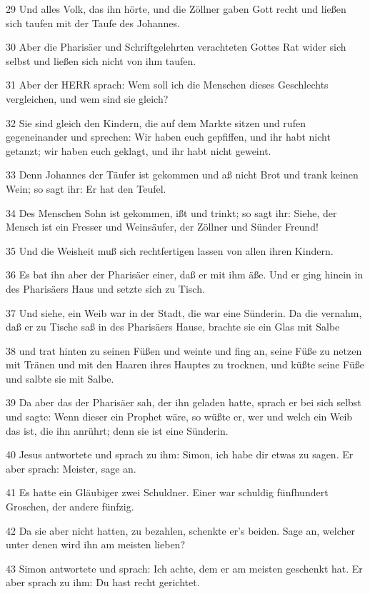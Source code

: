 \par 29 Und alles Volk, das ihn hörte, und die Zöllner gaben Gott recht und ließen sich taufen mit der Taufe des Johannes.
\par 30 Aber die Pharisäer und Schriftgelehrten verachteten Gottes Rat wider sich selbst und ließen sich nicht von ihm taufen.
\par 31 Aber der HERR sprach: Wem soll ich die Menschen dieses Geschlechts vergleichen, und wem sind sie gleich?
\par 32 Sie sind gleich den Kindern, die auf dem Markte sitzen und rufen gegeneinander und sprechen: Wir haben euch gepfiffen, und ihr habt nicht getanzt; wir haben euch geklagt, und ihr habt nicht geweint.
\par 33 Denn Johannes der Täufer ist gekommen und aß nicht Brot und trank keinen Wein; so sagt ihr: Er hat den Teufel.
\par 34 Des Menschen Sohn ist gekommen, ißt und trinkt; so sagt ihr: Siehe, der Mensch ist ein Fresser und Weinsäufer, der Zöllner und Sünder Freund!
\par 35 Und die Weisheit muß sich rechtfertigen lassen von allen ihren Kindern.
\par 36 Es bat ihn aber der Pharisäer einer, daß er mit ihm äße. Und er ging hinein in des Pharisäers Haus und setzte sich zu Tisch.
\par 37 Und siehe, ein Weib war in der Stadt, die war eine Sünderin. Da die vernahm, daß er zu Tische saß in des Pharisäers Hause, brachte sie ein Glas mit Salbe
\par 38 und trat hinten zu seinen Füßen und weinte und fing an, seine Füße zu netzen mit Tränen und mit den Haaren ihres Hauptes zu trocknen, und küßte seine Füße und salbte sie mit Salbe.
\par 39 Da aber das der Pharisäer sah, der ihn geladen hatte, sprach er bei sich selbst und sagte: Wenn dieser ein Prophet wäre, so wüßte er, wer und welch ein Weib das ist, die ihn anrührt; denn sie ist eine Sünderin.
\par 40 Jesus antwortete und sprach zu ihm: Simon, ich habe dir etwas zu sagen. Er aber sprach: Meister, sage an.
\par 41 Es hatte ein Gläubiger zwei Schuldner. Einer war schuldig fünfhundert Groschen, der andere fünfzig.
\par 42 Da sie aber nicht hatten, zu bezahlen, schenkte er's beiden. Sage an, welcher unter denen wird ihn am meisten lieben?
\par 43 Simon antwortete und sprach: Ich achte, dem er am meisten geschenkt hat. Er aber sprach zu ihm: Du hast recht gerichtet.
